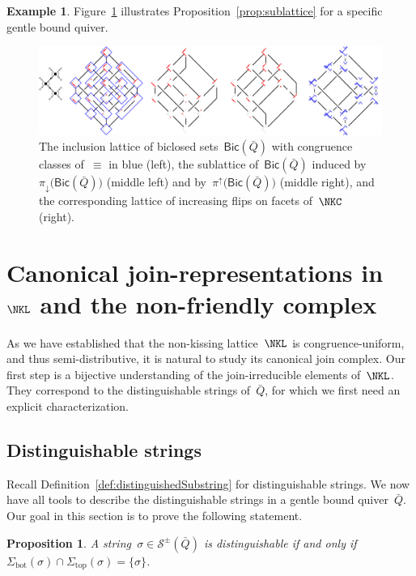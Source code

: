 \documentclass{amsart}
\newtheorem{proposition}[theorem]{Proposition}
\theoremstyle{definition}
\newtheorem{example}[theorem]{Example}
\newcommand{\fref}[1]{Figure~\ref{#1}} %
\newcommand{\strings}{\mathcal{S}} %
\renewcommand{\top}{\mathrm{top}} %
\newcommand{\bottom}{\mathrm{bot}} %
\newcommand{\Bicl}[1]{\mathsf{Bic}(#1)} %
\newcommand{\projDown}{\pi_\downarrow} %
\newcommand{\projUp}{\pi^\uparrow} %
\begin{document}
\begin{example}
\fref{fig:exmSublattice} illustrates Proposition~\ref{prop:sublattice} for a specific gentle bound quiver.

\begin{figure}[t]
	\capstart
	\centerline{\includegraphics[width=1.1\textwidth]{exmSublattice}}
	\caption{The inclusion lattice of biclosed sets~$\Bicl{\bar Q}$ with congruence classes of~$\equiv$ in blue (left), the sublattice of~$\Bicl{\bar Q}$ induced by~$\projDown \big( \Bicl{\bar Q} \big)$ (middle left) and by~$\projUp \big( \Bicl{\bar Q} \big)$ (middle right), and the corresponding lattice of increasing flips on facets of~$\NKC$ (right).}
	\label{fig:exmSublattice}
\end{figure}
\end{example}

\section{Canonical join-representations in~$\NKL$ and the non-friendly complex}
\label{sec:nonFriendlyComplex}

As we have established that the non-kissing lattice~$\NKL$ is congruence-uniform, and thus semi-distributive, it is natural to study its canonical join complex.
Our first step is a bijective understanding of the join-irreducible elements of~$\NKL$.
They correspond to the distinguishable strings of~$\bar Q$, for which we first need an explicit characterization.

\subsection{Distinguishable strings}
\label{subsec:distinguishableStrings}

Recall Definition~\ref{def:distinguishedSubstring} for distinguishable strings.
We now have all tools to describe the distinguishable strings in a gentle bound quiver~$\bar Q$.
Our goal in this section is to prove the following statement.

\begin{proposition}
\label{prop:characterizationDistinguishableStrings}
A string~$\sigma \in \strings^\pm(\bar Q)$ is distinguishable if and only if $\Sigma_\bottom(\sigma) \cap \Sigma_\top(\sigma) = \{\sigma\}$.
\end{proposition}
\end{document}
